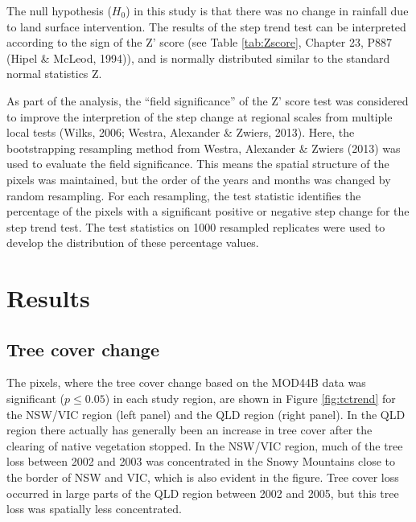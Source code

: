 \documentclass[fleqn,10pt,lineno]{wlpeerj} %
\theoremstyle{definition}
\theoremstyle{definition}
\theoremstyle{definition}
\theoremstyle{remark}
\begin{document}
The null hypothesis (\(H_0\)) in this study is that there was no change
in rainfall due to land surface intervention. The results of the step
trend test can be interpreted according to the sign of the Z' score (see
Table \ref{tab:Zscore}, Chapter 23, P887 (Hipel \& McLeod, 1994)), and
is normally distributed similar to the standard normal statistics Z.

As part of the analysis, the ``field significance'' of the Z' score test
was considered to improve the interpretion of the step change at
regional scales from multiple local tests (Wilks, 2006; Westra,
Alexander \& Zwiers, 2013). Here, the bootstrapping resampling method
from Westra, Alexander \& Zwiers (2013) was used to evaluate the field
significance. This means the spatial structure of the pixels was
maintained, but the order of the years and months was changed by random
resampling. For each resampling, the test statistic identifies the
percentage of the pixels with a significant positive or negative step
change for the step trend test. The test statistics on 1000 resampled
replicates were used to develop the distribution of these percentage
values.

\section{Results}\label{results}

\subsection{Tree cover change}\label{tree-cover-change}

The pixels, where the tree cover change based on the MOD44B data was
significant (\(p \leq 0.05\)) in each study region, are shown in Figure
\ref{fig:tctrend} for the NSW/VIC region (left panel) and the QLD region
(right panel). In the QLD region there actually has generally been an
increase in tree cover after the clearing of native vegetation stopped.
In the NSW/VIC region, much of the tree loss between 2002 and 2003 was
concentrated in the Snowy Mountains close to the border of NSW and VIC,
which is also evident in the figure. Tree cover loss occurred in large
parts of the QLD region between 2002 and 2005, but this tree loss was
spatially less concentrated.
\end{document}
